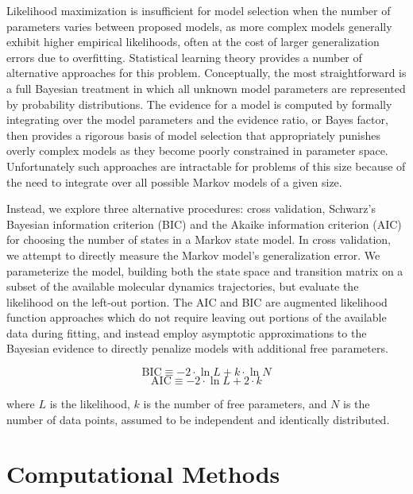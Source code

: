 \documentclass[twocolumn,floatfix,nofootinbib,aps]{revtex4-1}
\begin{document}
Likelihood maximization is insufficient for model selection when the number of parameters varies between proposed models, as more complex models generally exhibit higher empirical likelihoods, often at the cost of larger generalization errors due to overfitting\cite{Liddle2007Information, Hastie01Elements}. Statistical learning theory provides a number of alternative approaches for this problem. Conceptually, the most straightforward is a full Bayesian treatment in which all unknown model parameters are represented by probability distributions. The evidence for a model is computed by formally integrating over the model parameters and the evidence ratio, or Bayes factor\cite{Gelfand94Bayesian}, then provides a rigorous basis of model selection that appropriately punishes overly complex models as they become poorly constrained in parameter space. Unfortunately such approaches are intractable for problems of this size because of the need to integrate over all possible Markov models of a given size.

Instead, we explore three alternative procedures: cross validation, Schwarz's Bayesian information criterion (BIC)\cite{Schwartz78Estimating} and the Akaike information criterion (AIC)\cite{Akaike1974AIC} for choosing the number of states in a Markov state model. In cross validation, we attempt to directly measure the Markov model's generalization error. We parameterize the model, building both the state space and transition matrix on a subset of the available molecular dynamics trajectories, but evaluate the likelihood on the left-out portion. The AIC and BIC are augmented likelihood function approaches which do not require leaving out portions of the available data during fitting, and instead employ asymptotic approximations to the Bayesian evidence to directly penalize models with additional free parameters.

\begin{equation}
\label{eq:bic}
\mathrm{BIC} \equiv -2\cdot \ln L + k \cdot \ln N
\end{equation}
\begin{equation}
\label{eq:eic}
\mathrm{AIC} \equiv -2\cdot \ln L + 2 \cdot k
\end{equation}

where $L$ is the likelihood, $k$ is the number of free parameters, and $N$ is the number of data points, assumed to be independent and identically distributed.

\section{Computational Methods}
\end{document}
